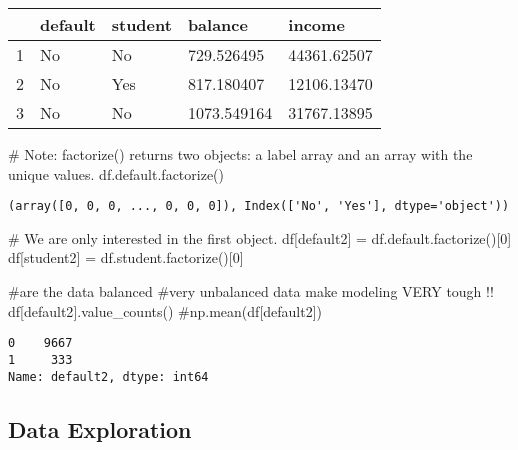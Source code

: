 \documentclass[
  letterpaper,
  DIV=11,
  numbers=noendperiod]{scrreprt}
\newenvironment{Shaded}{\begin{snugshade}}{\end{snugshade}}
\newcommand{\CommentTok}[1]{\textcolor[rgb]{0.37,0.37,0.37}{#1}}
\newcommand{\DecValTok}[1]{\textcolor[rgb]{0.68,0.00,0.00}{#1}}
\newcommand{\NormalTok}[1]{\textcolor[rgb]{0.00,0.23,0.31}{#1}}
\newcommand{\OperatorTok}[1]{\textcolor[rgb]{0.37,0.37,0.37}{#1}}
\newcommand{\StringTok}[1]{\textcolor[rgb]{0.13,0.47,0.30}{#1}}
\begin{document}
\begin{longtable}[]{@{}lllll@{}}
\toprule()
& default & student & balance & income \\
\midrule()
\endhead
1 & No & No & 729.526495 & 44361.62507 \\
2 & No & Yes & 817.180407 & 12106.13470 \\
3 & No & No & 1073.549164 & 31767.13895 \\
\bottomrule()
\end{longtable}

\begin{Shaded}
\begin{Highlighting}[]
\CommentTok{\# Note: factorize() returns two objects: a label array and an array with the unique values.}
\NormalTok{df.default.factorize()}
\end{Highlighting}
\end{Shaded}

\begin{verbatim}
(array([0, 0, 0, ..., 0, 0, 0]), Index(['No', 'Yes'], dtype='object'))
\end{verbatim}

\begin{Shaded}
\begin{Highlighting}[]
\CommentTok{\# We are only interested in the first object. }
\NormalTok{df[}\StringTok{\textquotesingle{}default2\textquotesingle{}}\NormalTok{] }\OperatorTok{=}\NormalTok{ df.default.factorize()[}\DecValTok{0}\NormalTok{]}
\NormalTok{df[}\StringTok{\textquotesingle{}student2\textquotesingle{}}\NormalTok{] }\OperatorTok{=}\NormalTok{ df.student.factorize()[}\DecValTok{0}\NormalTok{]}
\end{Highlighting}
\end{Shaded}

\begin{Shaded}
\begin{Highlighting}[]
\CommentTok{\#are the data balanced}
\CommentTok{\#very unbalanced data make modeling VERY tough !!}
\NormalTok{df[}\StringTok{\textquotesingle{}default2\textquotesingle{}}\NormalTok{].value\_counts()}
\CommentTok{\#np.mean(df[\textquotesingle{}default2\textquotesingle{}])}
\end{Highlighting}
\end{Shaded}

\begin{verbatim}
0    9667
1     333
Name: default2, dtype: int64
\end{verbatim}

\hypertarget{data-exploration}{%
\subsection{Data Exploration}\label{data-exploration}}
\end{document}
